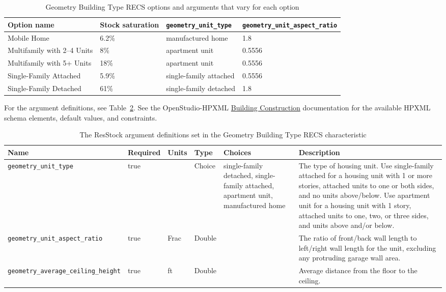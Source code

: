 \begin{longtable}[]{ |p{}|p{2cm}|p{4cm}|p{3cm}| }
\caption{Geometry Building Type RECS options and arguments that vary for each option} \label{table:hc_opt_gbt_recs} \\
\toprule\noalign{}
Option name & Stock saturation & \texttt{geometry\_unit\_type} &
\texttt{geometry\_unit\_aspect\_ratio} \\
\midrule\noalign{}
\endhead
\bottomrule\noalign{}
\endlastfoot
Mobile Home & 6.2\% & manufactured home & 1.8\\
Multifamily with 2--4 Units & 8\% & apartment unit & 0.5556\\
Multifamily with 5+ Units & 18\% & apartment unit & 0.5556 \\
Single-Family Attached & 5.9\% & single-family attached & 0.5556\\
Single-Family Detached & 61\% & single-family detached & 1.8 \\
\end{longtable}

For the argument definitions, see Table~\ref{table:hc_arg_def_gbt_recs}. See the OpenStudio-HPXML \href{https://openstudio-hpxml.readthedocs.io/en/v1.8.1/workflow_inputs.html#hpxml-building-construction}{Building Construction} documentation for the available HPXML schema elements, default values, and constraints.

\begin{longtable}[]{ |p{}|p{1.5cm}|p{1cm}|p{1.1cm}|p{1.4cm}|p{6cm}| }
\caption{The ResStock argument definitions set in the Geometry Building Type RECS characteristic} \label{table:hc_arg_def_gbt_recs}  \\
\toprule\noalign{}
Name & Required & Units & Type & Choices & Description \\
\midrule\noalign{}
\endhead
\bottomrule\noalign{}
\endlastfoot
\texttt{geometry\_unit\_type} & true & & Choice & single-family
detached, single-family attached, apartment unit, manufactured home &
The type of housing unit. Use single-family attached for a housing
unit with 1 or more stories, attached units to one or both sides, and no
units above/below. Use apartment unit for a housing unit with 1 story,
attached units to one, two, or three sides, and units above and/or
below. \\
\hline
\texttt{geometry\_unit\_aspect\_ratio} & true & Frac & Double & & The
ratio of front/back wall length to left/right wall length for the unit,
excluding any protruding garage wall area. \\
\hline
\texttt{geometry\_average\_ceiling\_height} & true & ft & Double & &
Average distance from the floor to the ceiling. \\
\end{longtable}

